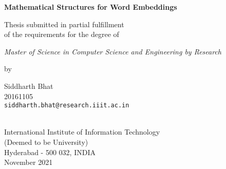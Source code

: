 \thispagestyle{empty}
\begin{center}
\vspace*{1.5cm}
{\Large \bf Mathematical Structures for Word Embeddings}

\vspace*{3.75cm}
{\large Thesis submitted in partial fulfillment\\}
{\large  of the requirements for the degree of \\}

\vspace*{1cm}
{\it {\large Master of Science in Computer Science and Engineering by Research} \\
}

\vspace*{1cm}
{\large by}

\vspace*{5mm}
{\large Siddharth Bhat\\}
{\large 20161105 \\
{\small \tt siddharth.bhat@research.iiit.ac.in }}


\vspace*{4.0cm}
{\\}
{\large International Institute of Information Technology\\}
{\large (Deemed to be University) \\}
{\large Hyderabad - 500 032, INDIA\\}
{\large November 2021 \\}
\end{center}
